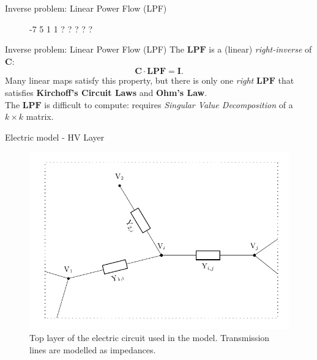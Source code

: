 \documentclass[10pt]{beamer}
\newcommand{\mat}[1]{\ensuremath{\boldsymbol{{#1}}}}
\begin{document}
\begin{frame}{Inverse problem: Linear Power Flow (LPF)}
    \begin{figure}
        \centering
        \graafjeduitsland
        {-7}
        {5}
        {1}
        {1}
        {?}
        {?}
        {?}
        {?}
        {?}
    \end{figure}
\end{frame}

\begin{frame}{Inverse problem: Linear Power Flow (LPF)}
The $\mat{LPF}$ is a (linear) \emph{right-inverse} of $\mat{C}$:
\[
\mat{C} \cdot \mat{LPF} = \mat{I}.
\]
Many linear maps satisfy this property, but there is only one \emph{right} $\mat{LPF}$ that satisfies \textbf{Kirchoff's Circuit Laws} and \textbf{Ohm's Law}.
\\[3em]
The $\mat{LPF}$ is difficult to compute: requires \emph{Singular Value Decomposition} of a $k \times k$ matrix.
\end{frame}

\begin{frame}{Electric model - HV Layer}
  \begin{figure}
      \centering
      \includegraphics[width=.8\textwidth]{img/vettegraaftoplayer.pdf}
      \caption{Top layer of the electric circuit used in the model. Transmission lines are modelled as impedances.}
      \label{fig:my_label}
  \end{figure}
\end{frame}
\end{document}
